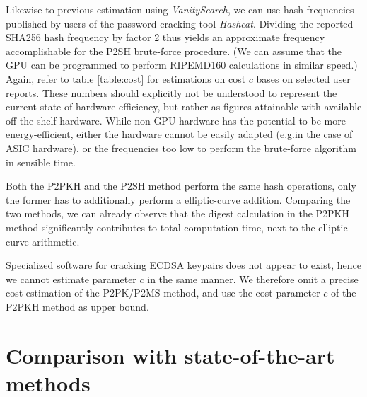 \documentclass[a4paper,11pt,titlepage]{scrbook}
\begin{document}
Likewise to previous estimation using \emph{VanitySearch}, we can use hash frequencies published by users of the password cracking tool \emph{Hashcat}.
Dividing the reported SHA256 hash frequency by factor 2 thus yields an approximate frequency accomplishable for the P2SH brute-force procedure.
(We can assume that the GPU can be programmed to perform RIPEMD160 calculations in similar speed.)
Again, refer to table \ref{table:cost} for estimations on cost $c$ bases on selected user reports.
These numbers should explicitly not be understood to represent the current state of hardware efficiency, but rather as figures attainable with available off-the-shelf hardware.
While non-GPU hardware has the potential to be more energy-efficient, either the hardware cannot be easily adapted (e.g.\@ in the case of ASIC hardware), or the frequencies too low to perform the brute-force algorithm in sensible time.

Both the P2PKH and the P2SH method perform the same hash operations, only the former has to additionally perform a elliptic-curve addition.
Comparing the two methods, we can already observe that the digest calculation in the P2PKH method significantly contributes to total computation time, next to the elliptic-curve arithmetic.

Specialized software for cracking ECDSA keypairs does not appear to exist, hence we cannot estimate parameter $c$ in the same manner.
We therefore omit a precise cost estimation of the P2PK/P2MS method, and use the cost parameter $c$ of the P2PKH method as upper bound.

\section{Comparison with state-of-the-art methods}\label{sec:comparison}
\end{document}
